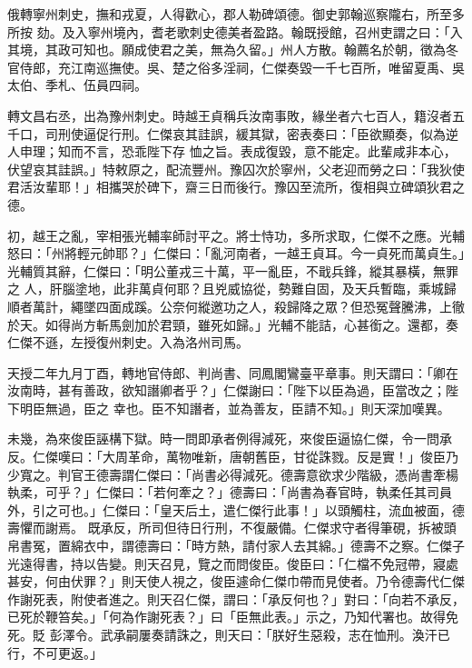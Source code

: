 \begin{pinyinscope}
 俄轉寧州刺史，撫和戎夏，人得歡心，郡人勒碑頌德。御史郭翰巡察隴右，所至多所按
 劾。及入寧州境內，耆老歌刺史德美者盈路。翰既授館，召州吏謂之曰：「入其境，其政可知也。願成使君之美，無為久留。」州人方散。翰薦名於朝，徵為冬官侍郎，充江南巡撫使。吳、楚之俗多淫祠，仁傑奏毀一千七百所，唯留夏禹、吳太伯、季札、伍員四祠。



 轉文昌右丞，出為豫州刺史。時越王貞稱兵汝南事敗，緣坐者六七百人，籍沒者五千口，司刑使逼促行刑。仁傑哀其詿誤，緩其獄，密表奏曰：「臣欲顯奏，似為逆人申理；知而不言，恐乖陛下存
 恤之旨。表成復毀，意不能定。此輩咸非本心，伏望哀其詿誤。」特敕原之，配流豐州。豫囚次於寧州，父老迎而勞之曰：「我狄使君活汝輩耶！」相攜哭於碑下，齋三日而後行。豫囚至流所，復相與立碑頌狄君之德。



 初，越王之亂，宰相張光輔率師討平之。將士恃功，多所求取，仁傑不之應。光輔怒曰：「州將輕元帥耶？」仁傑曰：「亂河南者，一越王貞耳。今一貞死而萬貞生。」光輔質其辭，仁傑曰：「明公董戎三十萬，平一亂臣，不戢兵鋒，縱其暴橫，無罪之
 人，肝腦塗地，此非萬貞何耶？且兇威協從，勢難自固，及天兵暫臨，乘城歸順者萬計，繩墜四面成蹊。公奈何縱邀功之人，殺歸降之眾？但恐冤聲騰沸，上徹於天。如得尚方斬馬劍加於君頸，雖死如歸。」光輔不能詰，心甚銜之。還都，奏仁傑不遜，左授復州刺史。入為洛州司馬。



 天授二年九月丁酉，轉地官侍郎、判尚書、同鳳閣鸞臺平章事。則天謂曰：「卿在汝南時，甚有善政，欲知譖卿者乎？」仁傑謝曰：「陛下以臣為過，臣當改之；陛下明臣無過，臣之
 幸也。臣不知譖者，並為善友，臣請不知。」則天深加嘆異。



 未幾，為來俊臣誣構下獄。時一問即承者例得減死，來俊臣逼協仁傑，令一問承反。仁傑嘆曰：「大周革命，萬物唯新，唐朝舊臣，甘從誅戮。反是實！」俊臣乃少寬之。判官王德壽謂仁傑曰：「尚書必得減死。德壽意欲求少階級，憑尚書牽楊執柔，可乎？」仁傑曰：「若何牽之？」德壽曰：「尚書為春官時，執柔任其司員外，引之可也。」仁傑曰：「皇天后土，遣仁傑行此事！」以頭觸柱，流血被面，德壽懼而謝焉。
 既承反，所司但待日行刑，不復嚴備。仁傑求守者得筆硯，拆被頭帛書冤，置綿衣中，謂德壽曰：「時方熱，請付家人去其綿。」德壽不之察。仁傑子光遠得書，持以告變。則天召見，覽之而問俊臣。俊臣曰：「仁檔不免冠帶，寢處甚安，何由伏罪？」則天使人視之，俊臣遽命仁傑巾帶而見使者。乃令德壽代仁傑作謝死表，附使者進之。則天召仁傑，謂曰：「承反何也？」對曰：「向若不承反，已死於鞭笞矣。」「何為作謝死表？」曰「臣無此表。」示之，乃知代署也。故得免死。貶
 彭澤令。武承嗣屢奏請誅之，則天曰：「朕好生惡殺，志在恤刑。渙汗已行，不可更返。」




\end{pinyinscope}
